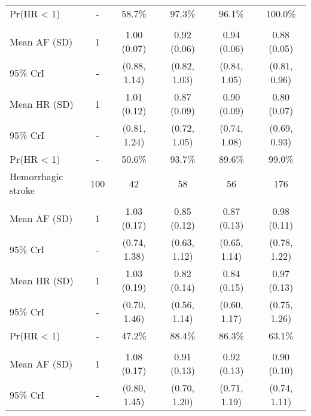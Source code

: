 \documentclass[nutrients,article,submitted,moreauthors,pdftex]{Definitions/mdpi}
\begin{document}
\begin{table}[H]
{\begin{tabular}[t]{lccccc}
\rowcolor{gray!6}  \hspace{1em}Pr(HR < 1) & - & 58.7\% & 97.3\% & 96.1\% & 100.0\%\\
\addlinespace[0.3em]
\multicolumn{6}{l}{\textbf{Model 2}}\\
\hspace{1em}Mean AF (SD) & 1 & 1.00 (0.07) & 0.92 (0.06) & 0.94 (0.06) & 0.88 (0.05)\\
\rowcolor{gray!6}  \hspace{1em}95\% CrI & - & (0.88, 1.14) & (0.82, 1.03) & (0.84, 1.05) & (0.81, 0.96)\\
\hspace{1em}Mean HR (SD) & 1 & 1.01 (0.12) & 0.87 (0.09) & 0.90 (0.09) & 0.80 (0.07)\\
\rowcolor{gray!6}  \hspace{1em}95\% CrI & - & (0.81, 1.24) & (0.72, 1.05) & (0.74, 1.08) & (0.69, 0.93)\\
\hspace{1em}Pr(HR < 1) & - & 50.6\% & 93.7\% & 89.6\% & 99.0\%\\
\hline
\rowcolor{gray!6}  Hemorrhagic stroke & 100 & 42 & 58 & 56 & 176\\
\addlinespace[0.3em]
\multicolumn{6}{l}{\textbf{Model 0}}\\
\hspace{1em}Mean AF (SD) & 1 & 1.03 (0.17) & 0.85 (0.12) & 0.87 (0.13) & 0.98 (0.11)\\
\rowcolor{gray!6}  \hspace{1em}95\% CrI & - & (0.74, 1.38) & (0.63, 1.12) & (0.65, 1.14) & (0.78, 1.22)\\
\hspace{1em}Mean HR (SD) & 1 & 1.03 (0.19) & 0.82 (0.14) & 0.84 (0.15) & 0.97 (0.13)\\
\rowcolor{gray!6}  \hspace{1em}95\% CrI & - & (0.70, 1.46) & (0.56, 1.14) & (0.60, 1.17) & (0.75, 1.26)\\
\hspace{1em}Pr(HR < 1) & - & 47.2\% & 88.4\% & 86.3\% & 63.1\%\\
\addlinespace[0.3em]
\multicolumn{6}{l}{\textbf{Model 1}}\\
\rowcolor{gray!6}  \hspace{1em}Mean AF (SD) & 1 & 1.08 (0.17) & 0.91 (0.13) & 0.92 (0.13) & 0.90 (0.10)\\
\hspace{1em}95\% CrI & - & (0.80, 1.45) & (0.70, 1.20) & (0.71, 1.19) & (0.74, 1.11)\\

\end{tabular}}
\end{table}
\end{document}
